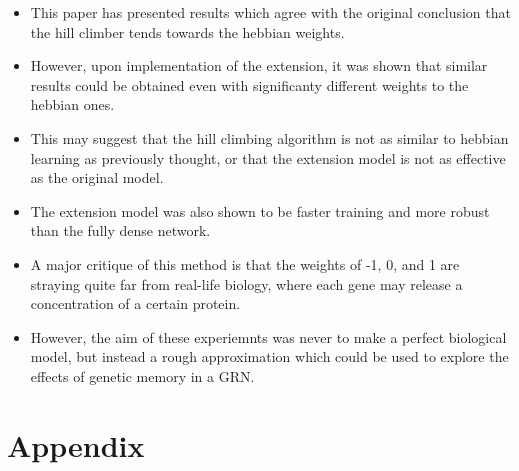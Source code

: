 \documentclass[twocolumn,a4paper]{article}
\begin{document}
    \begin{itemize}
        \item This paper has presented results which agree with the original conclusion that the hill climber tends towards the hebbian weights.
        \item However, upon implementation of the extension, it was shown that similar results could be obtained even with significanty different weights to the hebbian ones.
        \item This may suggest that the hill climbing algorithm is not as similar to hebbian learning as previously thought, or that the extension model is not as effective as the original model.
        \item The extension model was also shown to be faster training and more robust than the fully dense network.
        \item A major critique of this method is that the weights of -1, 0, and 1 are straying quite far from real-life biology, where each gene may release a concentration of a certain protein.
        \item However, the aim of these experiemnts was never to make a perfect biological model, but instead a rough approximation which could be used to explore the effects of genetic memory in a GRN.
    \end{itemize}


    \section{Appendix}
\end{document}
